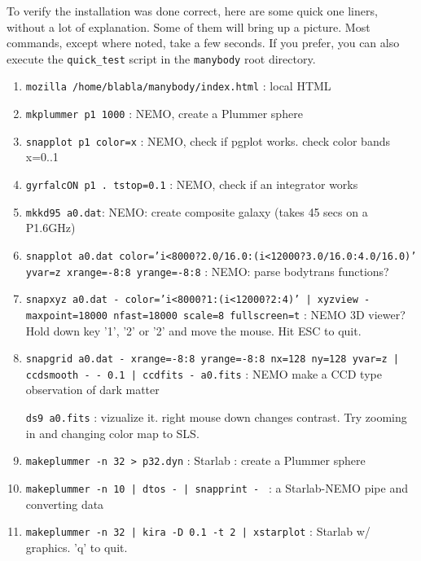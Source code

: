 To verify the installation was done correct, here are some quick
one liners, without a lot of explanation. Some of them will bring up
a picture. Most commands, except where noted, take a few seconds. If
you prefer, you can also execute the {\tt quick\_test} script in
the {\tt manybody} root directory.
\begin{enumerate}

\item
{\tt mozilla /home/blabla/manybody/index.html} : local HTML 

\item
{\tt mkplummer p1 1000} : NEMO, create a Plummer sphere

\item
{\tt snapplot p1 color=x} : NEMO, check if pgplot works. check color bands x=0..1

\item
{\tt gyrfalcON p1 . tstop=0.1} : NEMO, check if an integrator works

\item
{\tt mkkd95 a0.dat}: NEMO: create composite galaxy (takes 45 secs on a P1.6GHz)

\item
{\tt snapplot a0.dat color='i<8000?2.0/16.0:(i<12000?3.0/16.0:4.0/16.0)' yvar=z xrange=-8:8 yrange=-8:8} :
NEMO: parse bodytrans functions?

\item
{\tt snapxyz a0.dat - color='i<8000?1:(i<12000?2:4)' | xyzview - maxpoint=18000 nfast=18000 scale=8 fullscreen=t} : 
NEMO 3D viewer? Hold down key '1', '2' or '2' and move the mouse. Hit ESC to quit.

\item 
{\tt snapgrid a0.dat - xrange=-8:8 yrange=-8:8 nx=128 ny=128 yvar=z | ccdsmooth - - 0.1 | ccdfits - a0.fits} :
NEMO make a CCD type observation of dark matter

{\tt ds9 a0.fits} : vizualize it. right mouse down changes contrast. Try zooming in and changing color map to SLS.

\item
{\tt makeplummer -n 32 > p32.dyn} : Starlab : create a Plummer sphere


\item
{\tt makeplummer -n 10 | dtos - | snapprint - } : a Starlab-NEMO pipe and converting data

\item
{\tt makeplummer -n 32 | kira -D 0.1 -t 2 | xstarplot} : Starlab w/ graphics. 'q' to quit.


\end{enumerate}
